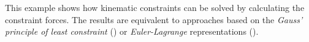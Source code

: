 \documentclass[a4paper,twoside, openright,12pt]{report}
\begin{document}
This example shows how kinematic constraints can be solved by calculating the constraint forces. The results are equivalent to approaches based on the \emph{Gauss' principle of least constraint} (\cite{Erhart_16}) or \emph{Euler-Lagrange} representations (\cite{Liu_02}).\\


 
\end{document}
